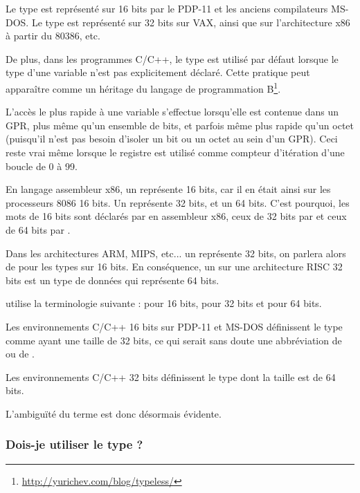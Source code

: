 Le type  est représenté sur 16 bits par le PDP-11 et les anciens compilateurs MS-DOS.
Le type  est représenté sur 32 bits sur VAX, ainsi que sur l'architecture x86 à partir du 80386, etc.

De plus, dans les programmes C/C++, le type  est utilisé par défaut lorsque le type d'une variable n'est pas explicitement déclaré.
Cette pratique peut apparaître comme un héritage du langage de programmation B\footnote{\url{http://yurichev.com/blog/typeless/}}.

\myhrule{}

L'accès le plus rapide à une variable s'effectue lorsqu'elle est contenue dans un \ac{GPR}, plus même qu'un ensemble de bits,
et parfois même plus rapide qu'un octet (puisqu'il n'est pas besoin d'isoler un bit ou un octet au sein d'un \ac{GPR}).
Ceci reste vrai même lorsque le registre est utilisé comme compteur d'itération d'une boucle de 0 à 99.

\myhrule{}

En langage assembleur x86, un  représente 16 bits, car il en était ainsi sur les processeurs 8086 16 bits.
Un  représente 32 bits, et un  64 bits.
C'est pourquoi, les mots de 16 bits sont déclarés par  en assembleur x86, ceux de 32 bits par  et ceux de 64 bits par .

Dans les architectures ARM, MIPS, etc... un  représente 32 bits, on parlera alors de  pour les types sur 16 bits.
En conséquence, un  sur une architecture RISC 32 bits est un type de données qui représente 64 bits.

 utilise la terminologie suivante :  pour 16 bits,  pour 32 bits et  pour 64 bits.

Les environnements C/C++ 16 bits sur PDP-11 et MS-DOS définissent le type  comme ayant une taille de 32 bits,
ce qui serait sans doute une abbréviation de  ou de .

Les environnements C/C++ 32 bits définissent le type  dont la taille est de 64 bits.

L'ambiguïté du terme  est donc désormais évidente.

\subsubsection{Dois-je utiliser le type ?}

